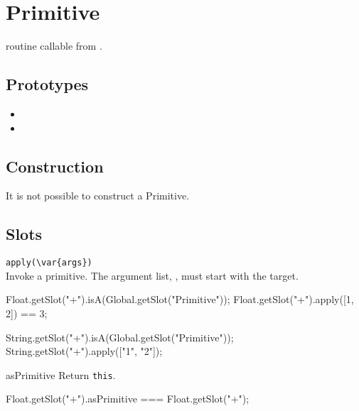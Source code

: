 
\section{Primitive}
\Cxx routine callable from \us.

\subsection{Prototypes}
\begin{itemize}
\item {}
\item {}
\end{itemize}

\subsection{Construction}

It is not possible to construct a Primitive.

\subsection{Slots}

\begin{urbiscriptapi}
\item \lstinline|apply(\var{args})|\\
  Invoke a primitive.  The argument list, , must start with
  the target.
\begin{urbiassert}
Float.getSlot("+").isA(Global.getSlot("Primitive"));
Float.getSlot("+").apply([1, 2]) == 3;

String.getSlot("+").isA(Global.getSlot("Primitive"));
String.getSlot("+").apply(["1", "2"]);
\end{urbiassert}

\item[asPrimitive] Return \lstinline|this|.
\begin{urbiassert}
Float.getSlot("+").asPrimitive === Float.getSlot("+");
\end{urbiassert}
\end{urbiscriptapi}


